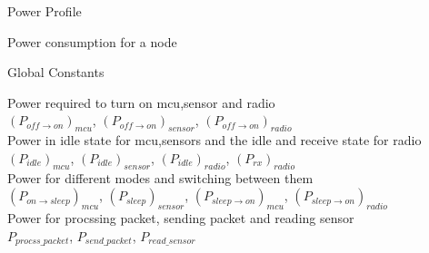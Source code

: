\documentclass{article}
\begin{document}
\centerline{\sc \huge Power Profile}


\begin{center}
	\large{Power consumption for a node}
\end{center}

\begin{center}
	Global Constants
\end{center}

Power required to turn on mcu,sensor and radio \\
$(P_{off \to on})_{mcu}$,
$(P_{off \to on})_{sensor}$,
$(P_{off \to on})_{radio}$
\\

Power in idle state for mcu,sensors and the idle and receive state for radio \\
$(P_{idle})_{mcu}$,
$(P_{idle})_{sensor}$,
$(P_{idle})_{radio}$,
$(P_{rx})_{radio}$
\\

Power for different modes and switching between them \\
$(P_{on \to sleep})_{mcu}$,
$(P_{sleep})_{sensor}$,
$(P_{sleep \to on})_{mcu}$,
$(P_{sleep \to on})_{radio}$
\\

Power for procssing packet, sending packet and reading sensor \\
$P_{procss\_packet}$,
$P_{send\_packet}$,
$P_{read\_sensor}$
\\
\end{document}
